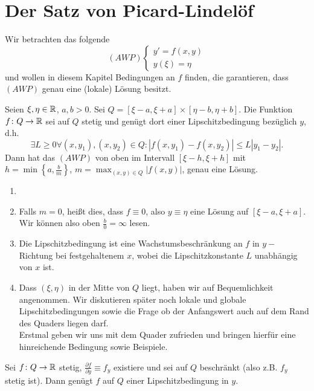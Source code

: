\chapter{Der Satz von Picard-Lindel\"of}
Wir betrachten das folgende
\[ (AWP)\begin{cases}
y'=f(x,y)\\y(\xi)=\eta
\end{cases} \]
und wollen in diesem Kapitel Bedingungen an $ f $ finden, die garantieren, dass $ (AWP) $ genau eine (lokale) L\"osung besitzt.
\begin{satz}
	Seien $ \xi,\eta\in\mathbb{R} $, $ a,b>0 $. Sei $ Q=[\xi-a,\xi+a]\times[\eta-b,\eta+b] $. Die Funktion $ f\colon Q\rightarrow\mathbb{R} $ sei auf $ Q $ stetig und gen\"ugt dort einer Lipschitzbedingung  bez\"uglich $ y $, d.h.
	\[ \exists L\geq 0\forall (x,y_1), (x,y_2)\in Q: |f(x,y_1)-f(x,y_2)|\leq L|y_1-y_2|. \]
	Dann hat das $ (AWP) $ von oben im Intervall $ [\xi-h,\xi+h] $ mit $ h=\min\left\lbrace a,\frac{b}{m}\right\rbrace $, $ m=\max_{(x,y)\in Q}|f(x,y)| $, genau eine L\"osung.
\end{satz}
\begin{bemerkung}
	\begin{enumerate}
		\item[]
		\item Falls $ m=0 $, hei\ss t dies, dass $ f\equiv 0 $, also $ y\equiv\eta $ eine L\"osung auf $ [\xi-a,\xi+a] $. Wir k\"onnen also oben $ \frac{b}{0}=\infty $ lesen.
		\item Die Lipschitzbedingung ist eine Wachstumsbeschr\"ankung an $ f $ in $ y- $Richtung bei festgehaltenem $ x $, wobei die Lipschitzkonstante $ L $ unabh\"angig von $ x $ ist.
		\item Dass $ (\xi,\eta) $ in der Mitte von $ Q $ liegt, haben wir auf Bequemlichkeit angenommen. Wir diskutieren sp\"ater noch lokale und globale Lipschitzbedingungen sowie die Frage ob der Anfangswert auch auf dem Rand des Quaders liegen darf.\\
		Erstmal geben wir uns mit dem Quader zufrieden und bringen hierf\"ur eine hinreichende Bedingung sowie Beispiele.
	\end{enumerate}
\end{bemerkung}
\begin{lemma}
	Sei $ f\colon Q\rightarrow\mathbb{R} $ stetig, $ \frac{\partial f}{\partial y}\equiv f_y $ existiere und sei auf $ Q $ beschr\"ankt (also z.B. $ f_y $ stetig ist). Dann gen\"ugt $ f $ auf $ Q $ einer Lipschitzbedingung in $ y $.
\end{lemma}
